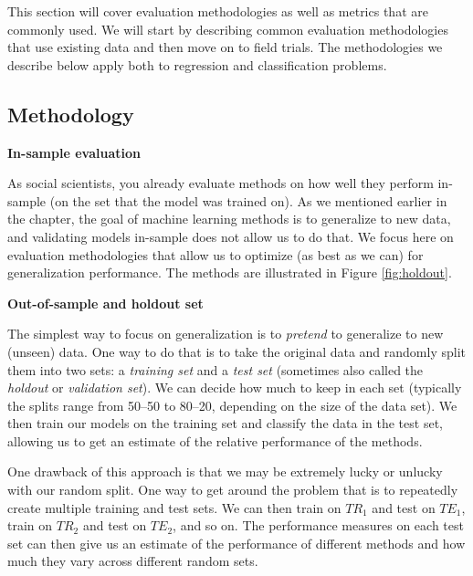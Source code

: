 \documentclass[]{krantz}
\begin{document}
This section will cover evaluation methodologies as well as metrics that
are commonly used. We will start by describing common evaluation
methodologies that use existing data and then move on to field trials.
The methodologies we describe below apply both to regression and
classification problems.

\subsection{Methodology}\label{methodology}

\textbf{In-sample evaluation}

As social scientists, you already evaluate methods on how well they
perform in-sample (on the set that the model was trained on). As we
mentioned earlier in the chapter, the goal of machine learning methods
is to generalize to new data, and validating models in-sample does not
allow us to do that. We focus here on evaluation methodologies that
allow us to optimize (as best as we can) for generalization performance.
The methods are illustrated in Figure \ref{fig:holdout}.

\textbf{Out-of-sample and holdout set}

The simplest way to focus on generalization is to \emph{pretend} to
generalize to new (unseen) data. One way to do that is to take the
original data and randomly split them into two sets: a \emph{training
set} and a \emph{test set} (sometimes also called the \emph{holdout} or
\emph{validation set}). We can decide how much to keep in each set
(typically the splits range from 50--50 to 80--20, depending on the size
of the data set). We then train our models on the training set and
classify the data in the test set, allowing us to get an estimate of the
relative performance of the methods.

One drawback of this approach is that we may be extremely lucky or
unlucky with our random split. One way to get around the problem that is
to repeatedly create multiple training and test sets. We can then train
on \(TR_1\) and test on \(TE_1\), train on \(TR_2\) and test on
\(TE_2\), and so on. The performance measures on each test set can then
give us an estimate of the performance of different methods and how much
they vary across different random sets.
\end{document}
